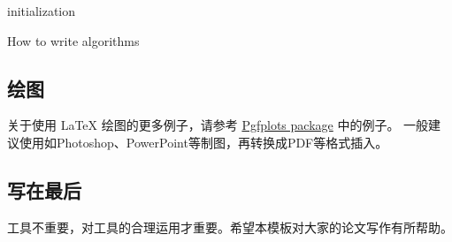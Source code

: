 \begin{algorithm}
    \SetAlgoLined
    initialization\;
    \caption{How to write algorithms}
\end{algorithm}


\subsection{绘图}

关于使用 \LaTeX{} 绘图的更多例子，请参考 \href{https://www.overleaf.com/learn/latex/Pgfplots_package}{Pgfplots package} 中的例子。
一般建议使用如Photoshop、PowerPoint等制图，再转换成PDF等格式插入。

\subsection{写在最后}
工具不重要，对工具的合理运用才重要。希望本模板对大家的论文写作有所帮助。
